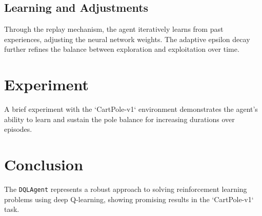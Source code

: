 \documentclass{article}
\begin{document}
\subsection{Learning and Adjustments}

Through the replay mechanism, the agent iteratively learns from past experiences, adjusting the neural network weights. The adaptive epsilon decay further refines the balance between exploration and exploitation over time.

\section{Experiment}

A brief experiment with the `CartPole-v1` environment demonstrates the agent's ability to learn and sustain the pole balance for increasing durations over episodes.

\section{Conclusion}

The \texttt{DQLAgent} represents a robust approach to solving reinforcement learning problems using deep Q-learning, showing promising results in the `CartPole-v1` task.
\end{document}
